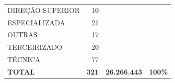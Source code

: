 \documentclass{article}
\begin{document}
\begin{longtable}[c]{m{7cm}|m{2.5cm}|m{2.5cm}|m{2.5cm}}
\multicolumn{1}{L{7cm}|}{ \hspace{3em} DIREÇÃO SUPERIOR} & \multicolumn{1}{r|}{ 10} &  & \\
\multicolumn{1}{L{7cm}|}{ \hspace{3em} ESPECIALIZADA} & \multicolumn{1}{r|}{ 21} &  & \\
\multicolumn{1}{L{7cm}|}{ \hspace{3em} OUTRAS} & \multicolumn{1}{r|}{ 17} &  & \\
\multicolumn{1}{L{7cm}|}{ \hspace{3em} TERCEIRIZADO} & \multicolumn{1}{r|}{ 20} &  & \\
\multicolumn{1}{L{7cm}|}{ \hspace{3em} TÉCNICA} & \multicolumn{1}{r|}{ 77} &  & \\
\hline \hline 
\multicolumn{1}{L{7cm}|}{ \textbf{TOTAL}} & \multicolumn{1}{r|}{ \textbf{321}} & \multicolumn{1}{r|}{ \textbf{26.266.443}} & \multicolumn{1}{r}{ \textbf{100\%}} \\
\end{longtable}
\newpage
\small
\end{document}
